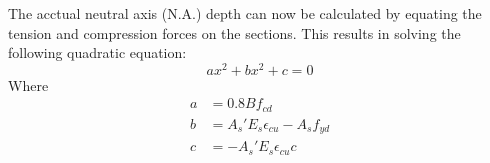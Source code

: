 The acctual neutral axis (N.A.) depth can now be
calculated by equating the tension and compression
forces on the sections. This results in solving
the following quadratic equation:
\begin{equation*}
ax^{2} + bx^{2} + c = 0
\end{equation*}
Where
\begin{align*}
  a &= 0.8 B f_{cd}\\
  b &= A_{s}' E_{s} \epsilon_{cu} - A_{s} f_{yd} \\
  c &= - A_{s}' E_{s}\epsilon_{cu} c
\end{align*}
